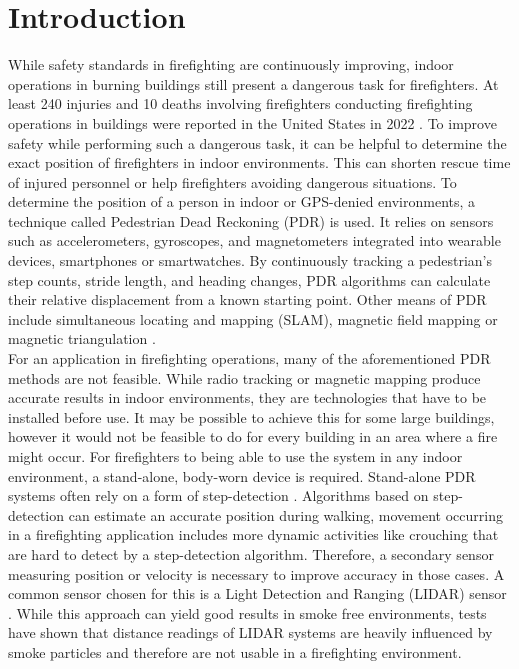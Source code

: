 \documentclass[engproc,conferenceproceedings,submit,pdftex,moreauthors]{Definitions/mdpi}
\begin{document}

\section{Introduction}

While safety standards in firefighting are continuously improving, indoor operations in burning buildings still present a dangerous task for firefighters. At least 240 injuries and 10 deaths involving firefighters conducting firefighting operations in buildings were reported in the United States in 2022 \cite{atemschutzunfalle.eu2023}. To improve safety while performing such a dangerous task, it can be helpful to determine the exact position of firefighters in indoor environments. This can shorten rescue time of injured personnel or help firefighters avoiding dangerous situations. To determine the position of a person in indoor or GPS-denied environments, a technique called Pedestrian Dead Reckoning (PDR) is used. It relies on sensors such as accelerometers, gyroscopes, and magnetometers integrated into wearable devices, smartphones or smartwatches. By continuously tracking a pedestrian's step counts, stride length, and heading changes, PDR algorithms can calculate their relative displacement from a known starting point. Other means of PDR include simultaneous locating and mapping (SLAM)\cite{lu2019}, magnetic field mapping \cite{wang2016} or magnetic triangulation \cite{arumugam2020}.\\

For an application in firefighting operations, many of the aforementioned PDR methods are not feasible. While radio tracking \cite{cong2023} or magnetic mapping \cite{wang2016} produce accurate results in indoor environments, they are technologies that have to be installed before use. It may be possible to achieve this for some large buildings, however it would not be feasible to do for every building in an area where a fire might occur. For firefighters to being able to use the system in any indoor environment, a stand-alone, body-worn device is required. Stand-alone PDR systems often rely on a form of step-detection \cite{hou2021}. Algorithms based on step-detection can estimate an accurate position during walking, movement occurring in a firefighting application includes more dynamic activities like crouching that are hard to detect by a step-detection algorithm. Therefore, a secondary sensor measuring position or velocity is necessary to improve accuracy in those cases. A common sensor chosen for this is a Light Detection and Ranging (LIDAR) sensor \cite{wang2016}. While this approach can yield good results in smoke free environments, tests have shown that distance readings of LIDAR systems are heavily influenced by smoke particles and therefore are not usable in a firefighting environment. \\
\end{document}
